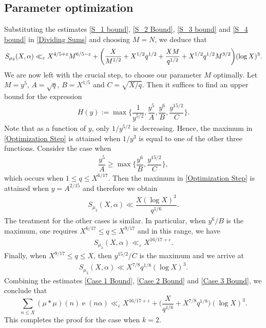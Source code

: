 \documentclass[11pt]{amsart}
\numberwithin{equation}{section}
\numberwithin{figure}{section}
\theoremstyle{definition}
\newcommand{\e}{\operatorname{e}}
\begin{document}
\subsection{Parameter optimization}
Substituting the estimates \eqref{S_1 bound}, \eqref{S_2 Bound}, \eqref{S_3 bound} and \eqref{S_4 bound} in \eqref{Dividing Sums} and choosing $M=N$, we deduce that
\begin{equation}
    S_{\mu_2}(X, \alpha) \ll_{\varepsilon}  X^{4/5+\varepsilon}M^{6/5-\varepsilon}+\bigg(\dfrac{X}{M^{1/2}} + X^{1/2}q^{1/2} + \dfrac{XM}{q^{1/2}} + X^{1/2}q^{1/2}M^{3/2}\bigg)(\log X)^3. \notag
\end{equation}
We are now left with the crucial step,  to choose our parameter $M$ optimally. Let $M=y^5$, $A= \sqrt{q}$, $B = X^{1/5}$ and $C  = \sqrt{{X}/{q}}$.  Then it suffices to find an upper bound for the expression
\begin{align}\label{Optimization Step}
    H(y):= \max \bigg \{ \dfrac{1}{y^{5/2}}, \dfrac{y^5}{A}, \dfrac{y^6}{B}, \dfrac{y^{15/2}}{C}  \bigg \}. 
\end{align} 
Note that as a function of $y$, only $1/y^{5/2}$ is decreasing. Hence, the maximum in \eqref{Optimization Step} is attained when $1/y^3$ is equal to one of the other three functions. Consider the case when 
\begin{align} \label{Case 1 Condition}
   \dfrac{y^5}{A} \geqslant \max \bigg \{ \dfrac{y^6}{B}, \dfrac{y^{15/2}}{C}  \bigg \},
\end{align} 
which occurs when $1 \leqslant q \leqslant X^{6/17}$. Then the maximum in \eqref{Optimization Step} is attained when $y = A^{2/15}$ 
and therefore we obtain
\begin{align} \label{Case 1 Bound}
    S_{\mu_2}(X, \alpha) \ll  \dfrac{X(\log X)^3}{q^{1/6}}.
\end{align}
The treatment for the other cases is similar. In particular, when $y^6/B$ is the maximum, one requires 
$X^{6/17}\leqslant q \leqslant X^{9/17}$ and in this range, we have
\begin{align} \label{Case 2 Bound}
    S_{\mu_2}(X, \alpha) \ll_{\varepsilon}  X^{16/17+\varepsilon}.
\end{align}
Finally, when $X^{9/17}\leqslant q \leqslant X$, then $y^{15/2}/C$ is the maximum and we arrive at 
\begin{align} \label{Case 3 Bound}
    S_{\mu_2}(X, \alpha) \ll  X^{7/8}q^{1/8}(\log X)^3.
\end{align}
Combining the estimates \eqref{Case 1 Bound}, \eqref{Case 2 Bound} and \eqref{Case 3 Bound}, we conclude that
\[
\sum_{n\leqslant X }(\mu*\mu)(n)\e(n\alpha) \ll_{\varepsilon} X^{16/17+\varepsilon}+\bigg(\dfrac{X}{q^{1/6}} + X^{7/8}q^{1/8}\bigg)(\log X)^{3}. 
\]
This completes the proof for the case when $k=2$.
\end{document}
